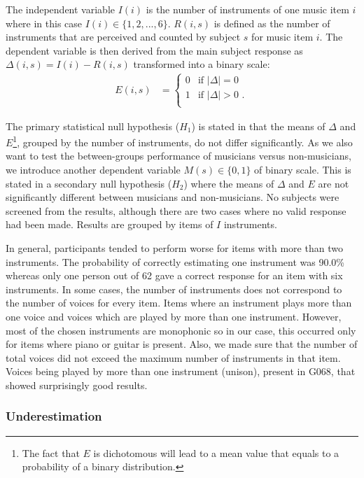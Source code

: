 The independent variable $I(i)$ is the number of instruments of one music item $i$ where in this case $I(i) \in \{1,2,...,6\}$. $R(i,s)$ is defined as the number of instruments that are perceived and counted by subject $s$ for music item $i$. The dependent variable is then derived from the main subject response as $\Delta(i,s) = I(i) - R(i,s)$ transformed into a binary scale:
\begin{align}%
\label{eq:response}
    E(i,s)&=\begin{cases}
        0 & \text{if $|\Delta| = 0 $ } \\
        1 & \text{if $|\Delta| > 0 $ .}\\
    \end{cases}
\end{align}
\par
The primary statistical null hypothesis ($H_1$) is stated in that the means of $\Delta$ and $E$\footnote{The fact that $E$ is dichotomous will lead to a mean value that equals to a probability of a binary distribution.}, grouped by the number of instruments, do not differ significantly. As we also want to test the between-groups performance of musicians versus non-musicians, we introduce another dependent variable $M(s) \in \{0,1\}$ of binary scale. This is stated in a secondary null hypothesis ($H_2$) where the means of $\Delta$ and $E$ are not significantly different between musicians and non-musicians.
No subjects were screened from the results, although there are two cases where no valid response had been made. Results are grouped by items of $I$ instruments.
\par
In general, participants tended to perform worse for items with more than two instruments. The probability of correctly estimating one instrument was 90.0\% whereas only one person out of 62 gave a correct response for an item with six instruments. In some cases, the number of instruments does not correspond to the number of voices for every item. Items where an instrument plays more than one voice and voices which are played by more than one instrument. However, most of the chosen instruments are monophonic so in our case, this occurred only for items where piano or guitar is present. Also, we made sure that the number of total voices did not exceed the maximum number of instruments in that item. Voices being played by more than one instrument (unison), present in G068, that showed surprisingly good results.

\subsubsection*{Underestimation}

